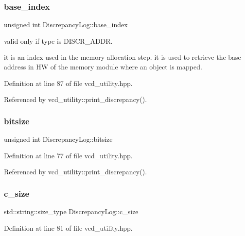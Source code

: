 \subsubsection{\texorpdfstring{base\+\_\+index}{base\_index}}
{\footnotesize\ttfamily unsigned int Discrepancy\+Log\+::base\+\_\+index}



valid only if type is D\+I\+S\+C\+R\+\_\+\+A\+D\+DR. 

it is an index used in the memory allocation step. it is used to retrieve the base address in HW of the memory module where an object is mapped. 

Definition at line 87 of file vcd\+\_\+utility.\+hpp.



Referenced by vcd\+\_\+utility\+::print\+\_\+discrepancy().

\mbox{\label{structDiscrepancyLog_a061e80dbb5e142ab31977e52c0e404ad}} 
\subsubsection{\texorpdfstring{bitsize}{bitsize}}
{\footnotesize\ttfamily unsigned int Discrepancy\+Log\+::bitsize}



Definition at line 77 of file vcd\+\_\+utility.\+hpp.



Referenced by vcd\+\_\+utility\+::print\+\_\+discrepancy().

\mbox{\label{structDiscrepancyLog_a44fb0948f5b5039293a0330b2e36dffd}} 
\subsubsection{\texorpdfstring{c\+\_\+size}{c\_size}}
{\footnotesize\ttfamily std\+::string\+::size\+\_\+type Discrepancy\+Log\+::c\+\_\+size}



Definition at line 81 of file vcd\+\_\+utility.\+hpp.

\mbox{\label{structDiscrepancyLog_a10f4fa59b64ee5a9086708a4b7e3b84f}} 

